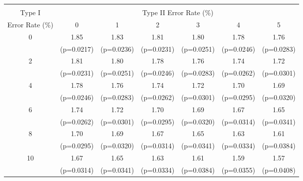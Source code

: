 \scriptsize{
\begin{tabular}{c|*{6}{c}}
\hline\hline \\[-8pt]
Type I & \multicolumn{6}{c}{Type II Error Rate (\%)} \\
Error Rate (\%)   & 0 & 1 & 2 & 3 & 4 & 5 \\ \hline
0 & 1.85 & 1.83 & 1.81 & 1.80 & 1.78 & 1.76 \\
 & (p=0.0217) & (p=0.0236) & (p=0.0231) & (p=0.0251) & (p=0.0246) & (p=0.0283) \\
[1em]
2 & 1.81 & 1.80 & 1.78 & 1.76 & 1.74 & 1.72 \\
 & (p=0.0231) & (p=0.0251) & (p=0.0246) & (p=0.0283) & (p=0.0262) & (p=0.0301) \\
[1em]
4 & 1.78 & 1.76 & 1.74 & 1.72 & 1.70 & 1.69 \\
 & (p=0.0246) & (p=0.0283) & (p=0.0262) & (p=0.0301) & (p=0.0295) & (p=0.0320) \\
[1em]
6 & 1.74 & 1.72 & 1.70 & 1.69 & 1.67 & 1.65 \\
 & (p=0.0262) & (p=0.0301) & (p=0.0295) & (p=0.0320) & (p=0.0314) & (p=0.0341) \\
[1em]
8 & 1.70 & 1.69 & 1.67 & 1.65 & 1.63 & 1.61 \\
 & (p=0.0295) & (p=0.0320) & (p=0.0314) & (p=0.0341) & (p=0.0334) & (p=0.0384) \\
[1em]
10 & 1.67 & 1.65 & 1.63 & 1.61 & 1.59 & 1.57 \\
 & (p=0.0314) & (p=0.0341) & (p=0.0334) & (p=0.0384) & (p=0.0355) & (p=0.0408) \\
\hline \hline
\end{tabular}
}